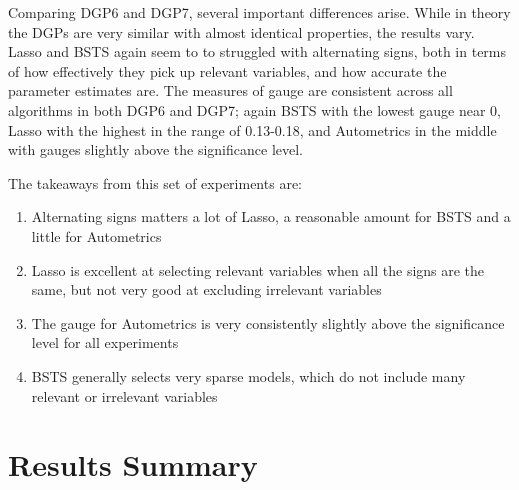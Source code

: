 \documentclass[11pt, oneside]{book}   	%
\begin{document}
Comparing DGP6 and DGP7, several important differences arise. While in theory the DGPs are very similar with almost identical properties, the results vary. Lasso and BSTS again seem to to struggled with alternating signs, both in terms of how effectively they pick up relevant variables, and how accurate the parameter estimates are. The measures of gauge are consistent across all algorithms in both DGP6 and DGP7; again BSTS with the lowest gauge near 0, Lasso with the highest in the range of 0.13-0.18, and Autometrics in the middle with gauges slightly above the significance level.

The takeaways from this set of experiments are:
\begin{enumerate}
\item Alternating signs matters a lot of Lasso, a reasonable amount for BSTS and a little for Autometrics
\item Lasso is excellent at selecting relevant variables when all the signs are the same, but not very good at excluding irrelevant variables
\item The gauge for Autometrics is very consistently slightly above the significance level for all experiments 
\item BSTS generally selects very sparse models, which do not include many relevant or irrelevant variables 
\end{enumerate} 

\clearpage
























 








\newpage

\section{Results Summary}
\end{document}
